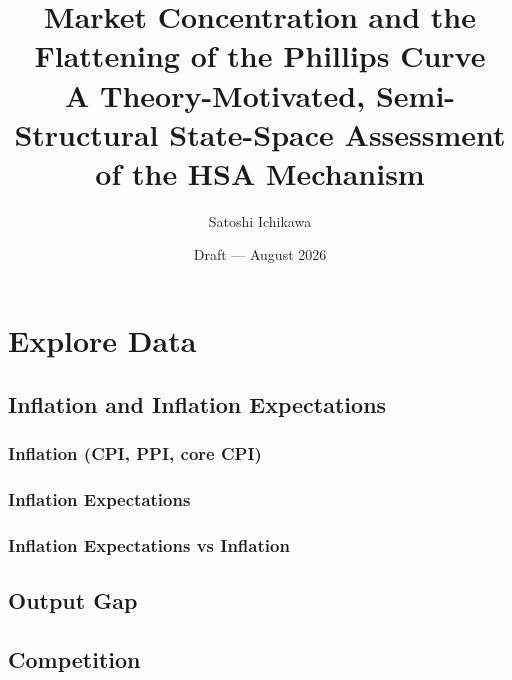 \documentclass[11pt]{article}
\title{\textbf{Market Concentration and the Flattening of the Phillips Curve}\\[2pt]
\large A Theory-Motivated, Semi-Structural State-Space Assessment of the HSA Mechanism}
\author{Satoshi Ichikawa}
\date{Draft --- August 2026}
\begin{document}
\section{Explore Data}

\subsection{Inflation and Inflation Expectations}
\subsubsection{Inflation (CPI, PPI, core CPI)}
\subsubsection{Inflation Expectations}
\subsubsection{Inflation Expectations vs Inflation}
\subsection{Output Gap}

\subsection{Competition}
\end{document}
